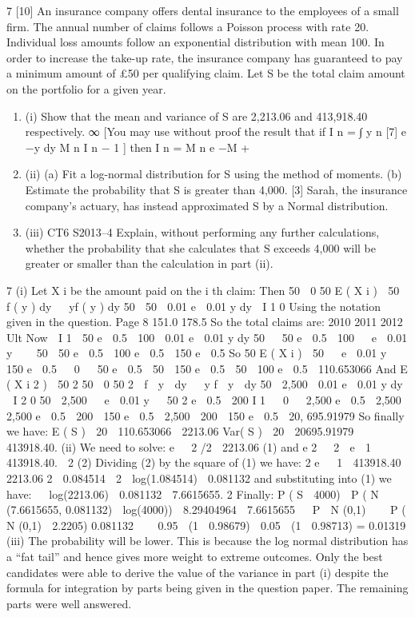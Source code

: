 \documentclass[a4paper,12pt]{article}
\begin{document}
7
[10]
An insurance company offers dental insurance to the employees of a small firm. The
annual number of claims follows a Poisson process with rate 20. Individual loss
amounts follow an exponential distribution with mean 100. In order to increase the
take-up rate, the insurance company has guaranteed to pay a minimum amount of £50
per qualifying claim. Let S be the total claim amount on the portfolio for a given
year.
\begin{enumerate}
\item (i)
Show that the mean and variance of S are 2,213.06 and 413,918.40
respectively.
∞
[You may use without proof the result that if I n =
∫ y
n
[7]
\lambda e −\lambda y dy
M
n
I n − 1 ]
\lambda
then I n = M n e −\lambda M +
\item (ii) (a) Fit a log-normal distribution for S using the method of moments.
(b) Estimate the probability that S is greater than 4,000.
[3]
Sarah, the insurance company’s actuary, has instead approximated S by a Normal
distribution.
\item (iii)
CT6 S2013–4
Explain, without performing any further calculations, whether the probability
that she calculates that S exceeds 4,000 will be greater or smaller than the
calculation in part (ii).
\end{enumerate}



\newpage

7
(i)
Let X i be the amount paid on the i th claim:
Then
50 
0 50
E ( X i )  50  f ( y ) dy   yf ( y ) dy
50
 50  0.01 e  0.01 y dy  I 1
0
Using the notation given in the question.
Page 8
151.0
178.5
So the total claims are:
2010
2011
2012
Ult
Now

I 1  50 e  0.5  100  0.01 e  0.01 y dy
50

 50 e  0.5  100   e  0.01 y 

 50
 50 e  0.5  100 e  0.5  150 e  0.5
So
50
E ( X i )  50   e  0.01 y   150 e  0.5

 0
  50 e  0.5  50  150 e  0.5  50  100 e  0.5  110.653066
And
E ( X i 2 )
 50
2
50 
0 50
2
 f  y  dy   y f  y  dy
50
 2,500  0.01 e  0.01 y dy  I 2
0
50
 2,500   e  0.01 y   50 2 e  0.5  200 I 1

 0
  2,500 e  0.5  2,500  2,500 e  0.5  200  150 e  0.5
 2,500  200  150 e  0.5  20, 695.91979
So finally we have:
E ( S )  20  110.653066  2213.06
Var( S )  20  20695.91979  413918.40.
(ii)
We need to solve:
e 
2
/2
 2213.06 (1)
and
e 2 
2
 e  1   413918.40.
 2
(2)
Dividing (2) by the square of (1) we have:
2
e   1 
413918.40
2213.06 2
 0.084514
 2  log(1.084514)  0.081132
and substituting into (1) we have:
  log(2213.06) 
0.081132
 7.6615655.
2
Finally:
P ( S  4000)  P ( N (7.6615655, 0.081132)  log(4000))

8.29404964  7.6615655 
 P  N (0,1) 
  P ( N (0,1)  2.2205)
0.081132


 0.95  (1  0.98679)  0.05  (1  0.98713)
= 0.01319
(iii)
The probability will be lower.
This is because the log normal distribution has a “fat tail” and hence gives
more weight to extreme outcomes.
Only the best candidates were able to derive the value of the variance in part (i) despite the
formula for integration by parts being given in the question paper. The remaining parts were
well answered.
\end{document}
